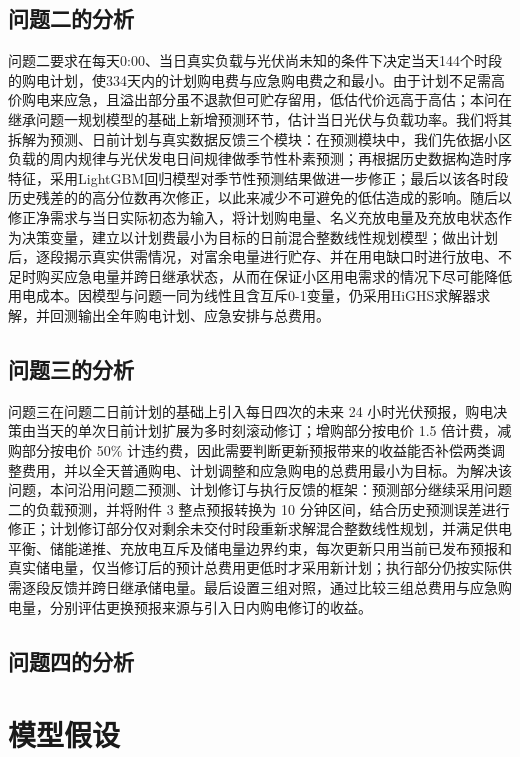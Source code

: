 \documentclass[12pt,a4paper]{ctexart}
\theoremstyle{definition}
\theoremstyle{plain}
\theoremstyle{remark}
\begin{document}
\subsection{问题二的分析}
问题二要求在每天0:00、当日真实负载与光伏尚未知的条件下决定当天144个时段的购电计划，使334天内的计划购电费与应急购电费之和最小。由于计划不足需高价购电来应急，且溢出部分虽不退款但可贮存留用，低估代价远高于高估；本问在继承问题一规划模型的基础上新增预测环节，估计当日光伏与负载功率。我们将其拆解为预测、日前计划与真实数据反馈三个模块：在预测模块中，我们先依据小区负载的周内规律与光伏发电日间规律做季节性朴素预测；再根据历史数据构造时序特征，采用LightGBM回归模型对季节性预测结果做进一步修正；最后以该各时段历史残差的的高分位数再次修正，以此来减少不可避免的低估造成的影响。随后以修正净需求与当日实际初态为输入，将计划购电量、名义充放电量及充放电状态作为决策变量，建立以计划费最小为目标的日前混合整数线性规划模型；做出计划后，逐段揭示真实供需情况，对富余电量进行贮存、并在用电缺口时进行放电、不足时购买应急电量并跨日继承状态，从而在保证小区用电需求的情况下尽可能降低用电成本。因模型与问题一同为线性且含互斥0-1变量，仍采用HiGHS求解器求解，并回测输出全年购电计划、应急安排与总费用。
\subsection{问题三的分析}
问题三在问题二日前计划的基础上引入每日四次的未来 24 小时光伏预报，购电决策由当天的单次日前计划扩展为多时刻滚动修订；增购部分按电价 1.5 倍计费，减购部分按电价 50\% 计违约费，因此需要判断更新预报带来的收益能否补偿两类调整费用，并以全天普通购电、计划调整和应急购电的总费用最小为目标。为解决该问题，本问沿用问题二预测、计划修订与执行反馈的框架：预测部分继续采用问题二的负载预测，并将附件 3 整点预报转换为 10 分钟区间，结合历史预测误差进行修正；计划修订部分仅对剩余未交付时段重新求解混合整数线性规划，并满足供电平衡、储能递推、充放电互斥及储电量边界约束，每次更新只用当前已发布预报和真实储电量，仅当修订后的预计总费用更低时才采用新计划；执行部分仍按实际供需逐段反馈并跨日继承储电量。最后设置三组对照，通过比较三组总费用与应急购电量，分别评估更换预报来源与引入日内购电修订的收益。
\subsection{问题四的分析}


\section{模型假设}
\end{document}
